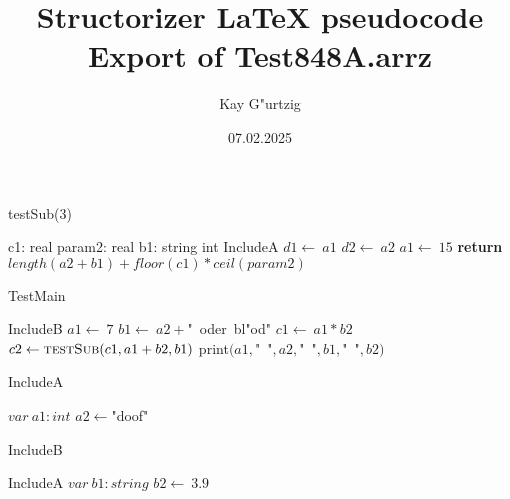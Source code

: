 \documentclass[a4paper,10pt]{article}
\title{Structorizer LaTeX pseudocode Export of Test848A.arrz}
\author{Kay G"urtzig}
\date{07.02.2025}
\begin{document}
\begin{algorithm}
\caption{testSub(3)}
\begin{algorithmic}[5]
    \State c1: real
    \State param2: real
    \State b1: string
  \EndDecl
    \State int
  \EndDecl
    \State IncludeA
  \EndDecl
  \State \(d1\gets\ a1\)
  \State \(d2\gets\ a2\)
  \State \(a1\gets\ 15\)
  \State \textbf{return} \(length(a2 + b1) + floor(c1) * ceil(param2)\)
\EndFunction
\end{algorithmic}
\end{algorithm}


\State {}


\begin{algorithm}
\caption{TestMain}
\begin{algorithmic}[5]
\State {}
    \State IncludeB
  \EndDecl
  \State \(a1\gets\ 7\)
  \State \(b1\gets\ a2+\)"{}\ oder\ bl"od"{}\(\)
  \State \(c1\gets\ a1*b2\)
  \State \(c2\gets\Call{testSub}{c1,a1+b2,b1}\)
  \State \(\)print\((a1,\)"{}\ "{}\(,a2,\)"{}\ "{}\(,b1,\)"{}\ "{}\(,b2)\)
\EndProcedure
\end{algorithmic}
\end{algorithm}


\begin{algorithm}
\caption{IncludeA}
\begin{algorithmic}[5]
  \State \(var\ a1:int\)
  \State \(a2\gets\)"{}doof"{}\(\)
\EndProcedure
\end{algorithmic}
\end{algorithm}


\begin{algorithm}
\caption{IncludeB}
\begin{algorithmic}[5]
    \State IncludeA
  \EndDecl
  \State \(var\ b1:string\)
  \State \(b2\gets\ 3.9\)
\EndProcedure
\end{algorithmic}
\end{algorithm}
\end{document}
